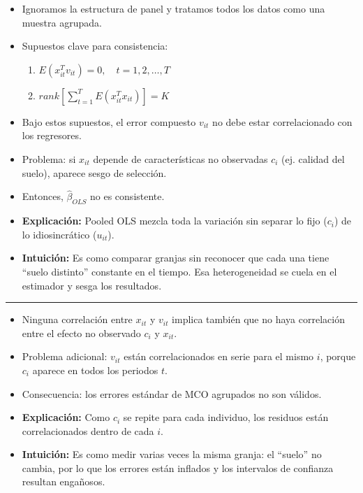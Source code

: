 \documentclass[12pt]{article}
\begin{document}
\begin{itemize}
    \item Ignoramos la estructura de panel y tratamos todos los datos como una muestra agrupada.
    \item Supuestos clave para consistencia:
    \begin{enumerate}
        \item $E(x_{it}^T v_{it}) = 0, \quad t=1,2,\dots,T$
        \item $rank\!\left[\sum_{t=1}^T E(x_{it}^T x_{it})\right] = K$
    \end{enumerate}
    \item Bajo estos supuestos, el error compuesto $v_{it}$ no debe estar correlacionado con los regresores.
    \item Problema: si $x_{it}$ depende de características no observadas $c_i$ (ej. calidad del suelo), 
    aparece sesgo de selección.
    \item Entonces, $\hat{\beta}_{OLS}$ no es consistente.
\end{itemize}

\begin{itemize}
    \item \textbf{Explicación:} Pooled OLS mezcla toda la variación sin separar lo fijo ($c_i$) de lo idiosincrático ($u_{it}$).
    \item \textbf{Intuición:} Es como comparar granjas sin reconocer que cada una tiene “suelo distinto” constante en el tiempo. 
    Esa heterogeneidad se cuela en el estimador y sesga los resultados.
\end{itemize}

\hrule

\begin{itemize}
    \item Ninguna correlación entre $x_{it}$ y $v_{it}$ implica también que no haya correlación entre 
    el efecto no observado $c_i$ y $x_{it}$.
    \item Problema adicional: $v_{it}$ están correlacionados en serie para el mismo $i$, 
    porque $c_i$ aparece en todos los periodos $t$.
    \item Consecuencia: los errores estándar de MCO agrupados no son válidos.
\end{itemize}

\begin{itemize}
    \item \textbf{Explicación:} Como $c_i$ se repite para cada individuo, los residuos están correlacionados dentro de cada $i$.
    \item \textbf{Intuición:} Es como medir varias veces la misma granja: el “suelo” no cambia, 
    por lo que los errores están inflados y los intervalos de confianza resultan engañosos.
\end{itemize}
\end{document}
